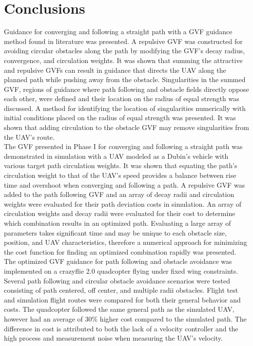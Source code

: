 \documentclass[numbered,pdftex]{ohio-etd}
\begin{document}
\chapter{Conclusions}


Guidance for converging and following a straight path with a GVF guidance method found in literature was presented. A repulsive GVF was constructed for avoiding circular obstacles along the path by modifying the GVF's decay radius, convergence, and circulation weights.  It was shown that summing the attractive and repulsive GVFs can result in guidance that directs the UAV along the planned path while pushing away from the obstacle. Singularities in the summed GVF, regions of guidance where path following and obstacle fields directly oppose each other, were defined and their location on the radius of equal strength was discussed. A method for identifying the location of singularities numerically with initial conditions placed on the radius of equal strength was presented. It was shown that adding circulation to the obstacle GVF may remove singularities from the UAV’s route. \\

The GVF presented in Phase I for converging and following a straight path was demonstrated in simulation with a UAV modeled as a Dubin's vehicle with various target path circulation weights. It was shown that equating the path’s circulation weight to that of the UAV’s speed provides a balance between rise time and overshoot when converging and following a path. A repulsive GVF was added to the path following GVF and an array of decay radii and circulation weights were evaluated for their path deviation costs in simulation. An array of circulation weights and decay radii were evaluated for their cost to determine which combination results in an optimized path.  Evaluating a large array of parameters takes significant time and may be unique to each obstacle size, position, and UAV characteristics, therefore a numerical approach for minimizing the cost function for finding an optimized combination rapidly was presented. \\

The optimized GVF guidance for path following and obstacle avoidance was implemented on a crazyflie 2.0 quadcopter flying under fixed wing constraints. Several path following and circular obstacle avoidance scenarios were tested consisting of path centered, off center, and multiple radii obstacles. Flight test and simulation flight routes were compared for both their general behavior and costs. The quadcopter followed the same general path as the simulated UAV, however had an average of $30 \%$ higher cost compared to the simulated path. The difference in cost is attributed to both the lack of a velocity controller and the high process and measurement noise when measuring the UAV’s velocity. 
\end{document}
